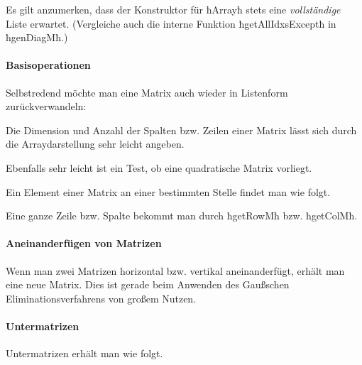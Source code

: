 \begin{bemerkung}
  Es gilt anzumerken, dass der Konstruktor für ħArrayħ stets eine
  \emph{vollständige} Liste erwartet. (Vergleiche auch die interne Funktion
  ħgetAllIdxsExceptħ in ħgenDiagMħ.)
\end{bemerkung}

\paragraph{Basisoperationen} 
Selbstredend möchte man eine Matrix auch wieder in Listenform zurückverwandeln:


Die Dimension und Anzahl der Spalten bzw. Zeilen  einer Matrix lässt 
sich durch die Arraydarstellung sehr leicht angeben.




Ebenfalls sehr leicht ist ein Test, ob eine quadratische
Matrix vorliegt.


Ein Element einer Matrix an einer bestimmten Stelle findet man wie folgt.


Eine ganze Zeile bzw. Spalte bekommt man durch ħgetRowMħ bzw. ħgetColMħ.


\paragraph{Aneinanderfügen von Matrizen} 
Wenn man zwei Matrizen horizontal bzw. vertikal aneinanderfügt, erhält man eine
neue Matrix. Dies ist gerade beim Anwenden des Gaußschen Eliminationsverfahrens
von großem Nutzen.


\paragraph{Untermatrizen} Untermatrizen erhält man wie folgt.



